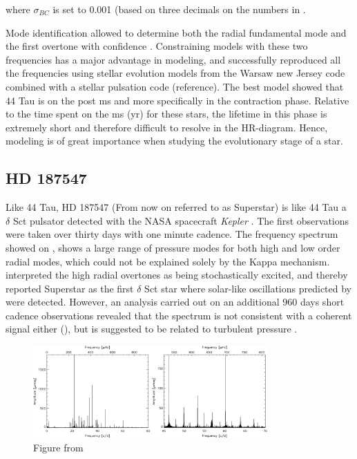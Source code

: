 \noindent where $\sigma_{BC}$ is set to 0.001 (based on three decimals on the numbers in \citet{Flower96}. 


Mode identification allowed to determine both the radial fundamental mode and the first overtone with confidence \citet{lenz2008asteroseismic}. Constraining models with these two frequencies has a major advantage in modeling, and \citet{lenz2010delta} successfully reproduced all the frequencies using stellar evolution models from the Warsaw new Jersey code combined with a stellar pulsation code (reference). The best model showed that 44 Tau is on the post ms and more specifically in the contraction phase. Relative to the time spent on the ms (yr) for these stars, the lifetime in this phase is extremely short and therefore difficult to resolve in the HR-diagram. Hence, modeling is of great importance when studying the evolutionary stage of a star. 
\\


\subsection{HD 187547}

Like 44 Tau, HD 187547 (From now on referred to as Superstar) is like 44 Tau a $\delta$ Sct pulsator detected with the NASA spacecraft \textit{Kepler} \citet{koch2010kepler}. The first observations were taken over thirty days with one minute cadence. The frequency spectrum showed on , shows a large range of pressure modes for both high and low order radial modes, which could not be explained solely by the Kappa mechanism. \citet{antoci2011excitation} interpreted the high radial overtones as being stochastically excited, and thereby reported Superstar as the first $\delta$ Sct star where solar-like oscillations predicted by \citet{houdek1999, samadi2002} were detected.  However, an analysis carried out on an additional 960 days short cadence observations revealed that the spectrum is not consistent with a coherent signal either (), but is suggested to be related to turbulent pressure \citep{antoci2014role}. 

\begin{figure}[htbp]
    \centering
    \includegraphics[width=0.8\textwidth]{superstarspectrum.jpg}
    \caption{Figure from \citet{antoci2011excitation}}
    \label{ssspectrum}
\end{figure}


